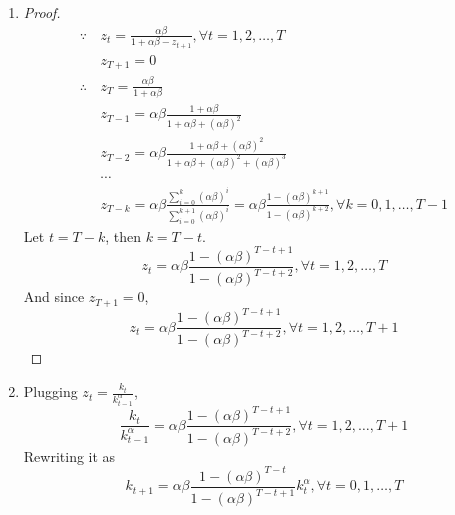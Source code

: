 \documentclass{article}
\begin{document}
\begin{enumerate}
\begin{enumerate}
\begin{figure}[h!]
          \end{figure}
        \item 
        \begin{proof}
            \begin{align*}
                \because\,&z_t=\frac{\alpha\beta}{1+\alpha\beta-z_{t+1}},\forall t=1,2,\dots,T\\
                &z_{T+1}=0\\
                \therefore\,&z_T=\frac{\alpha\beta}{1+\alpha\beta}\\
                &z_{T-1}=\alpha\beta\frac{1+\alpha\beta}{1+\alpha\beta+(\alpha\beta)^2}\\
                &z_{T-2}=\alpha\beta\frac{1+\alpha\beta+(\alpha\beta)^2}{1+\alpha\beta+(\alpha\beta)^2+(\alpha\beta)^3}\\
                &\cdots\\
                &z_{T-k}=\alpha\beta\frac{\sum_{i=0}^k(\alpha\beta)^i}{\sum_{i=0}^{k+1}(\alpha\beta)^i}
                =\alpha\beta\frac{1-(\alpha\beta)^{k+1}}{1-(\alpha\beta)^{k+2}},\forall k=0,1,\dots,T-1
            \end{align*}
            Let $t=T-k$, then \(k=T-t\). 
            \begin{equation*}
                z_t=\alpha\beta\frac{1-(\alpha\beta)^{T-t+1}}{1-(\alpha\beta)^{T-t+2}},\forall t=1,2,\dots,T
            \end{equation*}
            And since $z_{T+1}=0$, 
            \begin{equation*}
                z_t=\alpha\beta\frac{1-(\alpha\beta)^{T-t+1}}{1-(\alpha\beta)^{T-t+2}},\forall t=1,2,\dots,T+1
            \end{equation*}
        \end{proof}
        \item Plugging $z_t=\frac{k_t}{k_{t-1}^\alpha}$,
        \begin{equation*}
            \frac{k_t}{k_{t-1}^\alpha}=\alpha\beta\frac{1-(\alpha\beta)^{T-t+1}}{1-(\alpha\beta)^{T-t+2}},\forall t=1,2,\dots,T+1
        \end{equation*}
        Rewriting it as
        \begin{equation*}
            k_{t+1}=\alpha\beta\frac{1-(\alpha\beta)^{T-t}}{1-(\alpha\beta)^{T-t+1}}k_t^\alpha,\forall t=0,1,\dots,T
        \end{equation*}
    \end{enumerate}
\end{enumerate}
\end{document}
